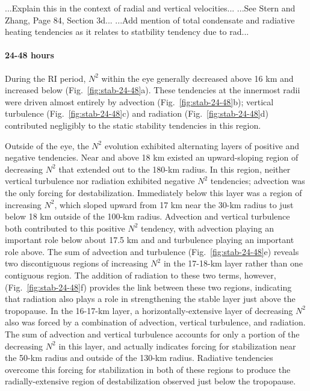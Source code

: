 \documentclass{ametsoc}
\begin{document}
...Explain this in the context of radial and vertical velocities...
...See Stern and Zhang, Page 84, Section 3d...
...Add mention of total condensate and radiative heating tendencies as it relates to statbility tendency due to rad...

\paragraph{24-48 hours}
During the RI period, $N^2$ within the eye generally decreased above 16 km and increased below (Fig.~\ref{fig:stab-24-48}a).
These tendencies at the innermost radii were driven almost entirely by advection (Fig.~\ref{fig:stab-24-48}b); vertical turbulence (Fig.~\ref{fig:stab-24-48}c) and radiation (Fig.~\ref{fig:stab-24-48}d) contributed negligibly to the static stability tendencies in this region.

Outside of the eye, the $N^2$ evolution exhibited alternating layers of positive and negative tendencies.
Near and above 18 km existed an upward-sloping region of decreasing $N^2$ that extended out to the 180-km radius.
In this region, neither vertical turbulence nor radiation exhibited negative $N^2$ tendencies; advection was the only forcing for destabilization.
Immediately below this layer was a region of increasing $N^2$, which sloped upward from 17 km near the 30-km radius to just below 18 km outside of the 100-km radius.
Advection and vertical turbulence both contributed to this positive $N^2$ tendency, with advection playing an important role below about 17.5 km and and turbulence playing an important role above.
The sum of advection and turbulence (Fig.~\ref{fig:stab-24-48}e) reveals two discontiguous regions of increasing $N^2$ in the 17-18-km layer rather than one contiguous region.
The addition of radiation to these two terms, however, (Fig.~\ref{fig:stab-24-48}f) provides the link between these two regions, indicating that radiation also plays a role in strengthening the stable layer just above the tropopause.
In the 16-17-km layer, a horizontally-extensive layer of decreasing $N^2$ also was forced by a combination of advection, vertical turbulence, and radiation.
The sum of advection and vertical turbulence accounts for only a portion of the decreasing $N^2$ in this layer, and actually indicates forcing for stabilization near the 50-km radius and outside of the 130-km radius.
Radiative tendencies overcome this forcing for stabilization in both of these regions to produce the radially-extensive region of destabilization observed just below the tropopause.
\end{document}
